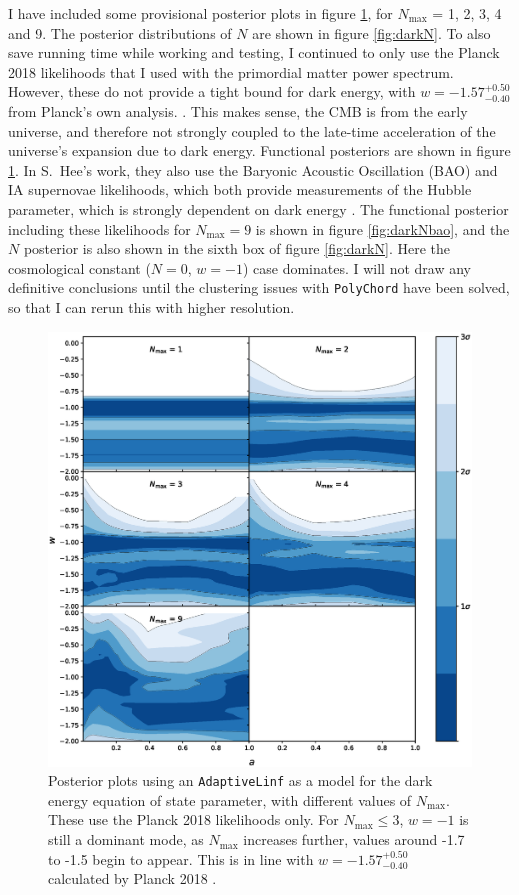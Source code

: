\documentclass{article}
\begin{document}
I have included some provisional posterior plots in figure \ref{fig:externalwa}, for $N_\textrm{max}$ = 1, 2, 3, 4 and 9. The posterior distributions of $N$ are shown in figure \ref{fig:darkN}. To also save running time while working and testing, I continued to only use the Planck 2018 likelihoods that I used with the primordial matter power spectrum. However, these do not provide a tight bound for dark energy, with $w=-1.57_{-0.40}^{+0.50}$ from Planck's own analysis. \cite{planck_6}. This makes sense, the CMB is from the early universe, and therefore not strongly coupled to the late-time acceleration of the universe's expansion due to dark energy. Functional posteriors are shown in figure \ref{fig:externalwa}. In S.~Hee's work, they also use the Baryonic Acoustic Oscillation (BAO) and IA supernovae likelihoods, which both provide measurements of the Hubble parameter, which is strongly dependent on dark energy \cite{Sonke, BAO1, BAO2, BAO3, SNIa}. The functional posterior including these likelihoods for $N_\textrm{max}=9$ is shown in figure \ref{fig:darkNbao}, and the $N$ posterior is also shown in the sixth box of figure \ref{fig:darkN}. Here the cosmological constant ($N=0$, $w=-1$) case dominates. I will not draw any definitive conclusions until the clustering issues with \texttt{PolyChord} have been solved, so that I can rerun this with higher resolution.

\newpage

\begin{figure}[H]
  \centering
  \includegraphics[width=16cm]{adaptivew.eps}
  \caption{Posterior plots using an \texttt{AdaptiveLinf} as a model for the dark energy equation of state parameter, with different values of $N_\textrm{max}$. These use the Planck 2018 likelihoods only. For $N_\textrm{max}\le 3$, $w=-1$ is still a dominant mode, as $N_\textrm{max}$ increases further, values around -1.7 to -1.5 begin to appear. This is in line with $w=-1.57_{-0.40}^{+0.50}$ calculated by Planck 2018 \cite{planck_6}.}
  \label{fig:externalwa}
\end{figure}
\end{document}
